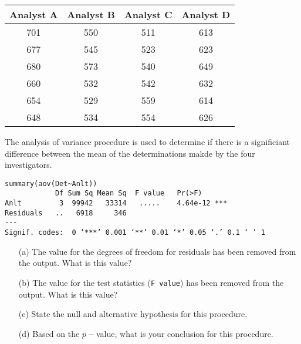 \documentclass[12pt]{article}
\begin{document}
\begin{center}
\begin{tabular}{|c|c|c|c|}
\hline Analyst A	&	Analyst B	&	Analyst C	&	Analyst D	\\ \hline
701	&	550	&	511	&	613	\\ \hline
677	&	545	&	523	&	623	\\ \hline
680	&	573	&	540	&	649	\\ \hline
660	&	532	&	542	&	632	\\ \hline
654	&	529	&	559	&	614	\\ \hline
648	&	534	&	554	&	626	\\ \hline
\end{tabular} 
\end{center}
The analysis of variance procedure is used to determine
if there is a significiant difference between the mean of the
determinations makde by the four investigators.


\begin{framed}
\begin{verbatim}
summary(aov(Det~Anlt))
            Df Sum Sq Mean Sq  F value   Pr(>F)    
Anlt         3  99942   33314   .....    4.64e-12 ***
Residuals   ..   6918     346                     
---
Signif. codes:  0 ‘***’ 0.001 ‘**’ 0.01 ‘*’ 0.05 ‘.’ 0.1 ‘ ’ 1
\end{verbatim}
\end{framed}

\begin{itemize}
\item[(a)] The value for the degrees of freedom for residuals has been removed from the output. What is this value?
\item[(b)] The value for the test statistics (\texttt{F value}) has been removed from the output. What is this value?
\item[(c)] State the null and alternative hypothesis for this procedure.
\item[(d)] Based on the $p-$value, what is your conclusion for this procedure.
\end{itemize}
\end{document}
